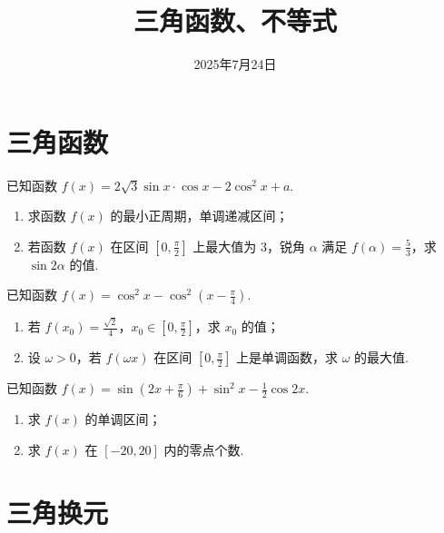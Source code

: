 \documentclass[a4paper , final]{ctexart}
\title{三角函数、不等式}
\date{2025年7月24日}
\newenvironment{problem}[1]{%
  \item #1
  \par
  \vspace{8cm}
}{}
\begin{document}
\maketitle

\section*{三角函数}

\begin{problems}
  \begin{problem}
  {
  已知函数 $f(x) = 2\sqrt{3}\sin x\cdot\cos x - 2\cos^2 x + a$.
  \begin{enumerate}[label=(\arabic*)]
    \item 求函数 $f(x)$ 的最小正周期，单调递减区间；
    \item 若函数 $f(x)$ 在区间 $\left[0, \frac{\pi}{2}\right]$ 上最大值为 $3$，锐角 $\alpha$ 满足 $f(\alpha) = \frac{5}{3}$，求 $\sin 2\alpha$ 的值.
  \end{enumerate}
  }
  \end{problem}

  \begin{problem}
  {
  已知函数 $f(x) = \cos^2 x - \cos^2\left(x - \frac{\pi}{4}\right)$.
  \begin{enumerate}[label=(\arabic*)]
    \item 若 $f(x_0) = \frac{\sqrt{2}}{4}$，$x_0 \in \left[0, \frac{\pi}{2}\right]$，求 $x_0$ 的值；
    \item 设 $\omega > 0$，若 $f(\omega x)$ 在区间 $\left[0, \frac{\pi}{2}\right]$ 上是单调函数，求 $\omega$ 的最大值.
  \end{enumerate}
  }
  \end{problem}

  \begin{problem}
  {
  已知函数 $f(x) = \sin\left(2x + \frac{\pi}{6}\right) + \sin^2 x - \frac{1}{2}\cos 2x$.
  \begin{enumerate}[label=(\Roman*)]
    \item 求 $f(x)$ 的单调区间；
    \item 求 $f(x)$ 在 $[-20, 20]$ 内的零点个数.
  \end{enumerate}
  }
  \end{problem}

\end{problems}
\newpage
\section*{三角换元}
\end{document}
